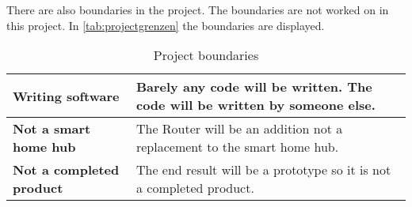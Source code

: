 There are also boundaries in the project. The boundaries are not worked on in this project. In \autoref{tab:projectgrenzen} the boundaries are displayed.

\begin{table}[H]
    \centering
    \begin{tabular}{l| p{8cm}}
        \bf Writing software & Barely any code will be written. The code will be written by someone else.\\\hline
        \bf Not a smart home hub & The Router will be an addition not a replacement to the smart home hub.\\\hline
        \bf Not a completed product & The end result will be a prototype so it is not a completed product.\\
        \end{tabular}
    \caption{Project boundaries}
    \label{tab:projectgrenzen}
\end{table}